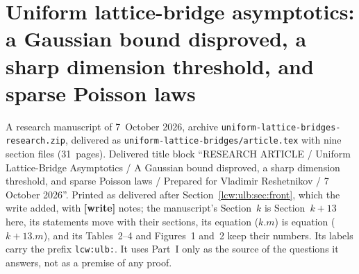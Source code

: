 \documentclass[11pt,letterpaper]{article}
\theoremstyle{remark}\newtheorem{remark}[theorem]{Remark}
\newcommand{\file}[1]{\nolinkurl{#1}}
\newcommand{\partsource}[1]{\par\noindent\begin{minipage}{\textwidth}\small #1\end{minipage}\par\medskip}
\begin{document}
\part{Uniform lattice-bridge asymptotics: a Gaussian bound disproved, a sharp dimension threshold, and sparse Poisson laws}\label{lcw:ulb:part}
\partsource{A research manuscript of 7~October 2026, archive
\file{uniform-lattice-bridges-research.zip}, delivered as
\file{uniform-lattice-bridges/article.tex} with nine section files
(31~pages). Delivered title block ``RESEARCH ARTICLE / Uniform Lattice-Bridge
Asymptotics / A Gaussian bound disproved, a sharp dimension threshold, and
sparse Poisson laws / Prepared for Vladimir Reshetnikov / 7 October 2026''.
Printed as delivered after Section~\ref{lcw:ulb:sec:front}, which the write
added, with \textbf{[write]} notes; the manuscript's Section~$k$ is
Section~$k+13$ here, its statements move with their sections, its equation
($k.m$) is equation ($k{+}13.m$), and its Tables~2--4 and Figures~1 and~2
keep their numbers. Its labels carry the prefix \file{lcw:ulb:}. It uses
Part~I only as the source of the questions it answers, not as a premise of
any proof.}
\end{document}
